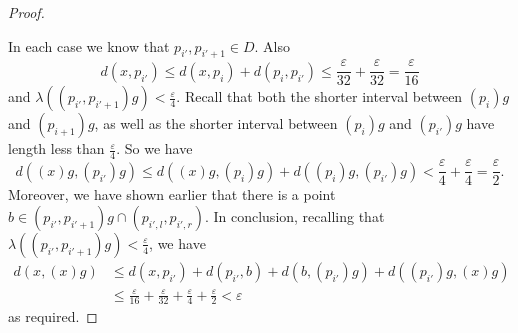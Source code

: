 \documentclass[11pt]{amsart}
\begin{document}
\begin{proof}
\begin{enumerate}
\end{enumerate}
In each case we know that \(p_{i'},p_{i'+1}\in D\). Also
\[d(x, p_{i'})\leq d(x,p_i)+d(p_{i}, p_{i'})\leq \frac{\varepsilon}{32}+\frac{\varepsilon}{32}=\frac{\varepsilon}{16}\] and \(\lambda((p_{i'}, p_{i'+1})g) < \frac{\varepsilon}{4}\). Recall that both the shorter interval between \((p_i)g\) and \((p_{i+1})g\), as well as the shorter interval between \((p_i)g\) and \((p_{i'})g\) have length less than \(\frac{\varepsilon}{4}\). 
So we have
\[d((x)g, (p_{i'})g)\leq d((x)g, (p_i)g)+d((p_{i})g, (p_{i'})g)< \frac{\varepsilon}{4}+\frac{\varepsilon}{4}=\frac{\varepsilon}{2}.\]
Moreover, we have shown earlier that there is a point \(b\in (p_{i'}, p_{i'+1})g\cap (p_{i',l},p_{i',r})\).
In conclusion, recalling that \(\lambda((p_{i'}, p_{i'+1})g)<\frac{\varepsilon}{4}\), we have
\begin{align*}
    d(x,(x)g)&\leq d(x,p_{i'})+d(p_{i'},b)+ d(b,(p_{i'})g)+d((p_{i'})g,(x)g) \\
    &\leq \frac{\varepsilon}{16}+\frac{\varepsilon}{32}+ \frac{\varepsilon}{4}+\frac{\varepsilon}{2}<\varepsilon
\end{align*}
as required.





\end{proof}
\end{document}
